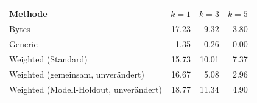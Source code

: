 \begin{tabular}{lrrr}
\toprule
Methode & $k=1$ & $k=3$ & $k=5$ \\
\midrule
Bytes & 17.23 & 9.32 & 3.80 \\
Generic & 1.35 & 0.26 & 0.00 \\
Weighted (Standard) & 15.73 & 10.01 & 7.37 \\
Weighted (gemeinsam, unverändert) & 16.67 & 5.08 & 2.96 \\
Weighted (Modell-Holdout, unverändert) & 18.77 & 11.34 & 4.90 \\
\bottomrule
\end{tabular}
